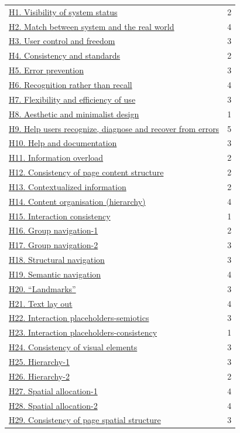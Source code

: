 \begin{longtable}{l r}
	
	\hyperref[subsec:H1]{H1. Visibility of system status} & 2  \\
	\hyperref[subsec:H2]{H2. Match between system and the real world} & 4  \\
	\hyperref[subsec:H3]{H3. User control and freedom} & 3 \\
	\hyperref[subsec:H4]{H4. Consistency and standards} & 2 \\
	\hyperref[subsec:H5]{H5. Error prevention} & 3 \\
	\hyperref[subsec:H6]{H6. Recognition rather than recall} & 4 \\
	\hyperref[subsec:H7]{H7. Flexibility and efficiency of use} & 3 \\
	\hyperref[subsec:H8]{H8. Aesthetic and minimalist design} & 1 \\
	\hyperref[subsec:H9]{H9. Help users recognize, diagnose and recover from errors} & 5 \\
	\hyperref[subsec:H10]{H10. Help and documentation} & 3 \\
	\hyperref[subsec:H11]{H11. Information overload} & 2 \\
	\hyperref[subsec:H12]{H12. Consistency of page content structure}  & 2 \\
	\hyperref[subsec:H13]{H13. Contextualized information} & 2 \\
	\hyperref[subsec:H14]{H14. Content organisation (hierarchy)} & 4 \\
	\hyperref[subsec:H15]{H15. Interaction consistency} & 1 \\
	\hyperref[subsec:H16]{H16. Group navigation-1} & 2 \\
	\hyperref[subsec:H17]{H17. Group navigation-2} & 3 \\
	\hyperref[subsec:H18]{H18. Structural navigation} & 3 \\
	\hyperref[subsec:H19]{H19. Semantic navigation} & 4 \\
	\hyperref[subsec:H20]{H20. “Landmarks”} & 3 \\
	\hyperref[subsec:H21]{H21. Text lay out} & 4 \\
	\hyperref[subsec:H22]{H22. Interaction placeholders-semiotics} & 3 \\
	\hyperref[subsec:H23]{H23. Interaction placeholders-consistency} & 1 \\
	\hyperref[subsec:H24]{H24. Consistency of visual elements} & 3 \\
	\hyperref[subsec:H25]{H25. Hierarchy-1} & 3 \\
	\hyperref[subsec:H26]{H26. Hierarchy-2} & 2 \\
	\hyperref[subsec:H27]{H27. Spatial allocation-1} & 4 \\
	\hyperref[subsec:H28]{H28. Spatial allocation-2} & 4 \\
	\hyperref[subsec:H29]{H29. Consistency of page spatial structure} & 3 \\
	
	
	
\end{longtable}

